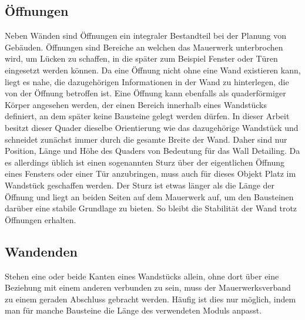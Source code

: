 \subsection{Öffnungen}\label{concept:openings}
Neben Wänden sind Öffnungen ein integraler Bestandteil bei der Planung von Gebäuden.
Öffnungen sind Bereiche an welchen das Mauerwerk unterbrochen wird, um Lücken zu schaffen, in die später zum Beispiel Fenster oder Türen eingesetzt werden können.
Da eine Öffnung nicht ohne eine Wand existieren kann, liegt es nahe, die dazugehörigen Informationen in der Wand zu hinterlegen, die von der Öffnung betroffen ist.
Eine Öffnung kann ebenfalls als quaderförmiger Körper angesehen werden, der einen Bereich innerhalb eines Wandstücks definiert, an dem später keine Bausteine gelegt werden dürfen.
In dieser Arbeit besitzt dieser Quader dieselbe Orientierung wie das dazugehörige Wandstück und schneidet zunächst immer durch die gesamte Breite der Wand.
Daher sind nur Position, Länge und Höhe des Quaders von Bedeutung für das Wall Detailing.
Da es allerdings üblich ist einen sogenannten Sturz über der eigentlichen Öffnung eines Fensters oder einer Tür anzubringen, muss auch für dieses Objekt Platz im Wandstück geschaffen werden. 
Der Sturz ist etwas länger als die Länge der Öffnung und liegt an beiden Seiten auf dem Mauerwerk auf, um den Bausteinen darüber eine stabile Grundlage zu bieten.
So bleibt die Stabilität der Wand trotz Öffnungen erhalten.

\subsection{Wandenden}\label{concept:wandende}
Stehen eine oder beide Kanten eines Wandstücks allein, ohne dort über eine Beziehung mit einem anderen verbunden zu sein, muss der Mauerwerksverband zu einem geraden Abschluss gebracht werden.
Häufig ist dies nur möglich, indem man für manche Bausteine die Länge des verwendeten Moduls anpasst.

